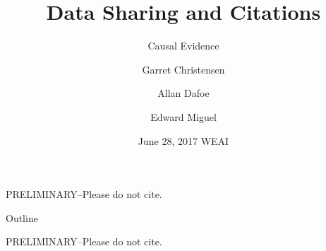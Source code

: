 \documentclass{beamer}
\title[Data Sharing and Citations] %
{Data Sharing and Citations}
\subtitle
{Causal Evidence} %
\author[Christensen, Dafoe, Miguel] %
{Garret Christensen\inst{1} \and Allan Dafoe\inst{2} \and Edward Miguel\inst{3}}
\institute[Universities of Somewhere and Elsewhere] %
{
  \inst{1}%
  Berkeley Institute for Data Science, UC Berkeley
  \and
  \inst{2}%
  Department of Political Science, Yale University
  \and
  \inst{3}%
  Department of Economics, UC Berkeley}
\date[Short Occasion] %
{June 28, 2017 WEAI}
\begin{document}
{ %
    \begin{frame}[plain]
     \end{frame}
}

\begin{frame}
  \titlepage
  \begin{center}
  \begin{large}
  PRELIMINARY--Please do not cite.
  \end{large}
  \end{center}
\end{frame}


\begin{frame}{Outline}
  \tableofcontents
  \begin{center}
  \begin{large}
  PRELIMINARY--Please do not cite.
  \end{large}
  \end{center}
\end{frame}
\end{document}
